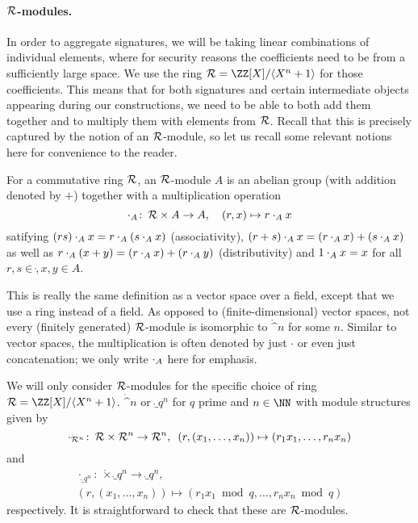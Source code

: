 \paragraph{$\mathcal{R}$-modules.}
In order to aggregate signatures, we will be taking linear combinations of individual elements, where for security reasons the coefficients need to be from a sufficiently large space. We use the ring $\ring = \defring$ for those coefficients. This means that for both signatures and certain intermediate objects appearing during our constructions, we need to be able to both add them together and to multiply them with elements from $\mathcal{R}$. Recall that this is precisely captured by the notion of an $\mathcal{R}$-module, so let us recall some relevant notions here for convenience to the reader. 
\begin{definition}
For a commutative ring $\mathcal{R}$, an $\mathcal{R}$-module $A$ is an abelian group (with addition denoted by $+$) together with a multiplication operation
\[
 \mathbin{\cdot_A}\colon\,\mathcal{R}\times A \to A,\quad (r, x)\mapsto r\mathbin{\cdot_A} x
\]
satifying $(rs)\mathbin{\cdot_A} x = r\mathbin{\cdot_A} (s\mathbin{\cdot_A} x)$ (associativity), $(r+s)\mathbin{\cdot_A} x = (r\mathbin{\cdot_A} x) + (s\mathbin{\cdot_A} x)$ as well as $r\mathbin{\cdot_A}(x + y) = (r\mathbin{\cdot_A} x) + (r\mathbin{\cdot_A} y)$ (distributivity) and $1\mathbin{\cdot_A} x = x$ for all $r,s\in\ring, x,y\in A$.
\end{definition}
This is really the same definition as a vector space over a field, except that we use a ring instead of a field. As opposed to (finite-dimensional) vector spaces, not every (finitely generated) $\mathcal{R}$-module is isomorphic to $\ring^n$ for some $n$. Similar to vector spaces, the multiplication is often denoted by just $\cdot$ or even just concatenation; we only write $\mathbin{\cdot_A}$ here for emphasis.

We will only consider $\mathcal{R}$-modules for the specific choice of ring $\ring = \defring$.  $\ring^n$ or $\ring_q^n$ for $q$ prime and $n\in\NN$ with module structures given by
\[
 \cdot_{\mathcal{R}^n}\colon\, \mathcal{R} \times \mathcal{R}^n \to \mathcal{R}^n,\enspace (r,(x_1,\ldots, x_n))\mapsto (r_1x_1,\ldots,r_nx_n)\\
\]
and
\[
  \begin{aligned}
 \cdot_{\ring_q^n}\colon\, \ring \times \ring_q^n \to \ring_q^n,\\ (r,(x_1,\ldots, x_n)) \mapsto (r_1x_1\bmod q,\ldots, r_nx_n\bmod q)
 \end{aligned}
\]
respectively.
It is straightforward to check that these are $\mathcal{R}$-modules.

